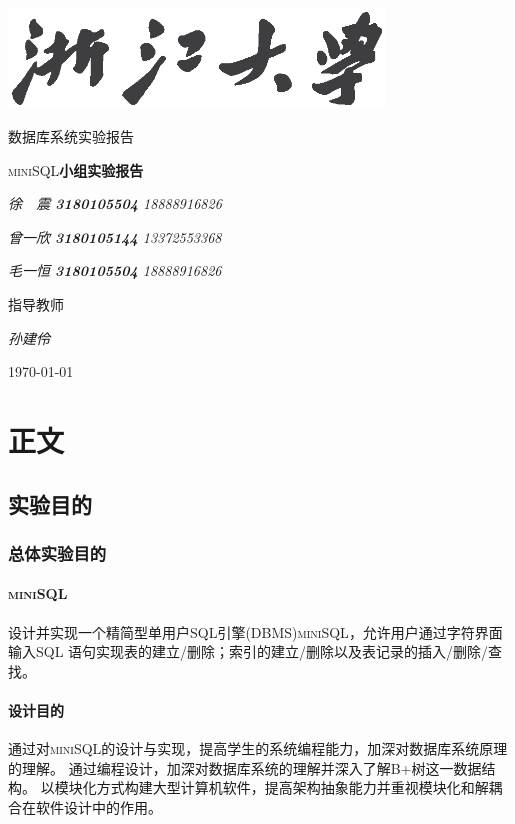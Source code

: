 \documentclass[UTF8]{ctexrep} %
\begin{document}
\begin{titlepage}
	\centering
	\includegraphics[width=0.75\textwidth]{figure/浙江大学.eps}\par\vspace{1cm}
	{\scshape\LARGE 数据库系统实验报告\par}
	\vspace{1.5cm}
	{\huge\textsc{\textsc{miniSQL}}\textbf{小组实验报告}\par}
	\vspace{2cm}
	{\Large\itshape 徐\ \ 震 \textbf{3180105504} 18888916826\par}
	{\Large\itshape 曾一欣 \textbf{3180105144} 13372553368\par}
	{\Large\itshape 毛一恒 \textbf{3180105504} 18888916826\par}
	\vfill
	指导教师\par
	\textit{孙建伶}

	\vfill

	{\large \today\par}
\end{titlepage}


\newpage
\tableofcontents
\newpage
\part{正文}
\chapter{实验目的}
\section{总体实验目的}
\subsection{\textsc{miniSQL}}
设计并实现一个精简型单用户SQL引擎(DBMS)\textsc{miniSQL}，允许用户通过字符界面输入SQL 语句实现表的建立/删除；索引的建立/删除以及表记录的插入/删除/查找。

\subsection{设计目的}
通过对\textsc{miniSQL}的设计与实现，提高学生的系统编程能力，加深对数据库系统原理的理解。
通过编程设计，加深对数据库系统的理解并深入了解B+树这一数据结构。
以模块化方式构建大型计算机软件，提高架构抽象能力并重视模块化和解耦合在软件设计中的作用。
\end{document}
